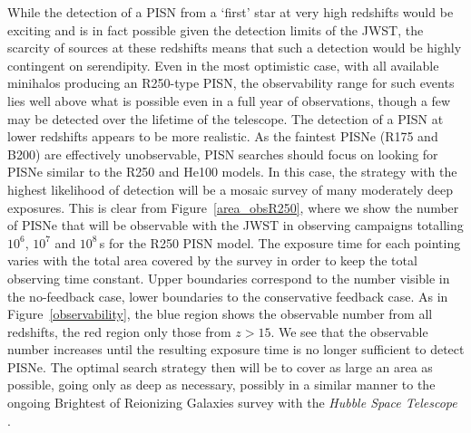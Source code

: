 \documentclass{thesis}
\newcommand{\RefFig}[1]{\mbox{Figure~\ref{#1}}}
\begin{document}
While the detection of a PISN from a `first' star at very high
redshifts would be exciting and is in fact possible given the
detection limits of the JWST, the scarcity of sources at these
redshifts means that such a detection would be highly contingent on
serendipity. Even in the most optimistic case, with all available
minihalos producing an R250-type PISN, the observability range for
such events lies well above what is possible even in a full year of
observations, though a few may be detected over the lifetime of the
telescope.  The detection of a PISN at lower redshifts appears to be
more realistic.  As the faintest PISNe (R175 and B200) are effectively
unobservable, PISN searches should focus on looking for PISNe similar
to the R250 and He100 models.  In this case, the strategy with the
highest likelihood of detection will be a mosaic survey of many
moderately deep exposures.  This is clear from \RefFig{area_obsR250},
where we show the number of PISNe that will be observable with the
JWST in observing campaigns totalling $10^6$, $10^7$ and $10^8\,$s for
the R250 PISN model. The exposure time for each pointing varies with
the total area covered by the survey in order to keep the total
observing time constant.  Upper boundaries correspond to the number
visible in the no-feedback case, lower boundaries to the conservative
feedback case. As in \RefFig{observability}, the blue region shows the
observable number from all redshifts, the red region only those from
$z>15$.  We see that the observable number increases until the
resulting exposure time is no longer sufficient to detect PISNe.  The
optimal search strategy then will be to cover as large an area as
possible, going only as deep as necessary, possibly in a similar
manner to the ongoing Brightest of Reionizing Galaxies survey with the
{\it Hubble Space Telescope} \citep{Trentietal2011, Bradleyetal2012}.
\end{document}
